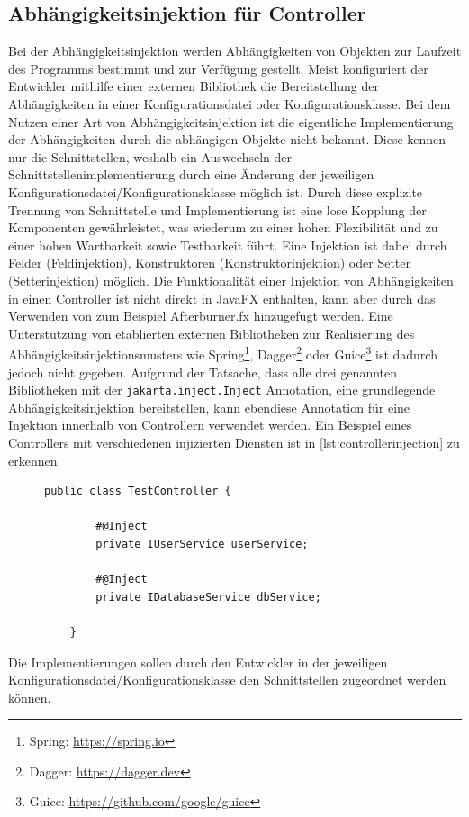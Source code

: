 \subsection{Abhängigkeitsinjektion für Controller}
Bei der Abhängigkeitsinjektion werden Abhängigkeiten von Objekten zur Laufzeit des Programms bestimmt und zur Verfügung gestellt. Meist konfiguriert der Entwickler mithilfe einer externen Bibliothek die Bereitstellung der Abhängigkeiten in einer Konfigurationsdatei oder Konfigurationsklasse. Bei dem Nutzen einer Art von Abhängigkeitsinjektion ist die eigentliche Implementierung der Abhängigkeiten durch die abhängigen Objekte nicht bekannt. Diese kennen nur die Schnittstellen, weshalb ein Auswechseln der Schnittstellenimplementierung durch eine Änderung der jeweiligen Konfigurationsdatei/Konfigurationsklasse möglich ist. Durch diese explizite Trennung von Schnittstelle und Implementierung ist eine lose Kopplung der Komponenten gewährleistet, was wiederum zu einer hohen Flexibilität und zu einer hohen Wartbarkeit sowie Testbarkeit führt. Eine Injektion ist dabei durch Felder (Feldinjektion), Konstruktoren (Konstruktorinjektion) oder Setter (Setterinjektion) möglich. Die Funktionalität einer Injektion von Abhängigkeiten in einen Controller ist nicht direkt in JavaFX enthalten, kann aber durch das Verwenden von zum Beispiel Afterburner.fx hinzugefügt werden. Eine Unterstützung von etablierten externen Bibliotheken zur Realisierung des Abhängigkeitsinjektionsmusters wie Spring\footnote{Spring: \url{https://spring.io}}, Dagger\footnote{Dagger: \url{https://dagger.dev}} oder Guice\footnote{\label{ft:guice}Guice: \url{https://github.com/google/guice}} ist dadurch jedoch nicht gegeben. Aufgrund der Tatsache, dass alle drei genannten Bibliotheken mit der \texttt{jakarta.inject.Inject} Annotation, eine grundlegende Abhängigkeitsinjektion bereitstellen, kann ebendiese Annotation für eine Injektion innerhalb von Controllern verwendet werden. Ein Beispiel eines Controllers mit verschiedenen injizierten Diensten ist in \autoref{lst:controllerinjection} zu erkennen.
\begin{figure}[H]
	\centering
	\begin{lstlisting}[caption=Beispiel -- Controller mit injizierten Diensten., captionpos=b, label=lst:controllerinjection]
	public class TestController {
	
		#@Inject
		private IUserService userService;
		
		#@Inject
		private IDatabaseService dbService;
	
	}
	\end{lstlisting}
\end{figure}
\noindent Die Implementierungen sollen durch den Entwickler in der jeweiligen Konfigurationsdatei/Konfigurationsklasse den Schnittstellen zugeordnet werden können.
